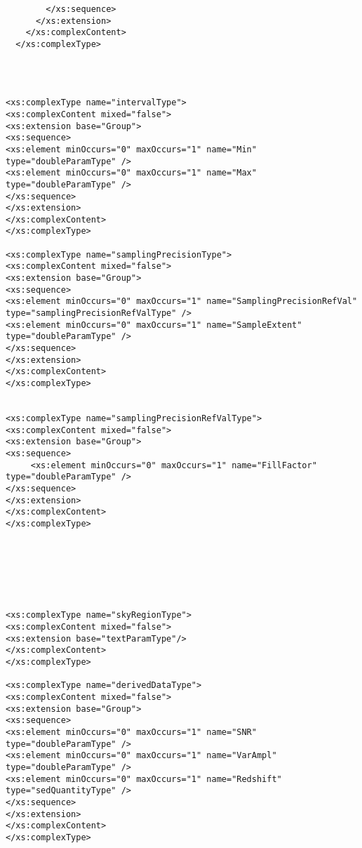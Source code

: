 {\begin{flushleft}
\begin{fmppage}
\begin{verbatim}
        </xs:sequence>
      </xs:extension>
    </xs:complexContent>
  </xs:complexType>




<xs:complexType name="intervalType">
<xs:complexContent mixed="false">
<xs:extension base="Group">
<xs:sequence>
<xs:element minOccurs="0" maxOccurs="1" name="Min" type="doubleParamType" />
<xs:element minOccurs="0" maxOccurs="1" name="Max" type="doubleParamType" />
</xs:sequence>
</xs:extension>
</xs:complexContent>
</xs:complexType>

<xs:complexType name="samplingPrecisionType">
<xs:complexContent mixed="false">
<xs:extension base="Group">
<xs:sequence>
<xs:element minOccurs="0" maxOccurs="1" name="SamplingPrecisionRefVal" type="samplingPrecisionRefValType" />
<xs:element minOccurs="0" maxOccurs="1" name="SampleExtent" type="doubleParamType" />
</xs:sequence>
</xs:extension>
</xs:complexContent>
</xs:complexType>


<xs:complexType name="samplingPrecisionRefValType">
<xs:complexContent mixed="false">
<xs:extension base="Group">
<xs:sequence>
     <xs:element minOccurs="0" maxOccurs="1" name="FillFactor" type="doubleParamType" />
</xs:sequence>
</xs:extension>
</xs:complexContent>
</xs:complexType>




\end{verbatim}
\end{fmppage}

\begin{fmppage}
\begin{verbatim}



<xs:complexType name="skyRegionType">
<xs:complexContent mixed="false">
<xs:extension base="textParamType"/>
</xs:complexContent>
</xs:complexType>

<xs:complexType name="derivedDataType">
<xs:complexContent mixed="false">
<xs:extension base="Group">
<xs:sequence>
<xs:element minOccurs="0" maxOccurs="1" name="SNR" type="doubleParamType" />
<xs:element minOccurs="0" maxOccurs="1" name="VarAmpl" type="doubleParamType" />
<xs:element minOccurs="0" maxOccurs="1" name="Redshift" type="sedQuantityType" />
</xs:sequence>
</xs:extension>
</xs:complexContent>
</xs:complexType>



\end{verbatim}
\end{fmppage}
\end{flushleft}}
